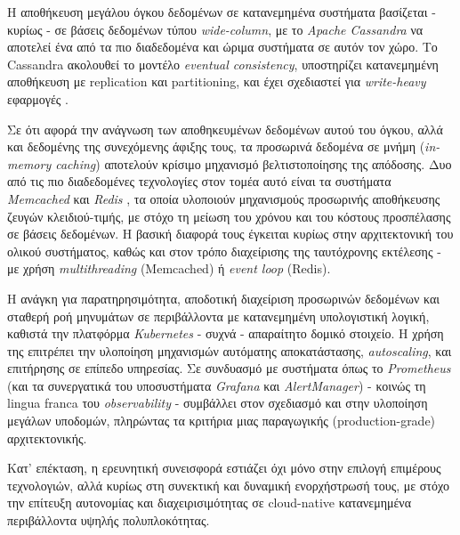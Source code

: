 Η αποθήκευση μεγάλου όγκου δεδομένων σε κατανεμημένα συστήματα βασίζεται - κυρίως - σε βάσεις δεδομένων τύπου \textit{wide-column}, με το \textit{Apache Cassandra} να αποτελεί ένα από τα πιο διαδεδομένα και ώριμα συστήματα σε αυτόν τον χώρο. Το Cassandra ακολουθεί το μοντέλο \textit{eventual consistency}, υποστηρίζει κατανεμημένη αποθήκευση με replication και partitioning, και έχει σχεδιαστεί για \textit{write-heavy} εφαρμογές \cite{cassandrawp}.

Σε ότι αφορά την ανάγνωση των αποθηκευμένων δεδομένων αυτού του όγκου, αλλά και δεδομένης της συνεχόμενης άφιξης τους, τα προσωρινά δεδομένα σε μνήμη (\textit{in-memory caching}) αποτελούν κρίσιμο μηχανισμό βελτιστοποίησης της απόδοσης. Δυο από τις πιο διαδεδομένες τεχνολογίες στον τομέα αυτό είναι τα συστήματα \textit{Memcached} \cite{memcachedfb} και \textit{Redis} \cite{redisia}, τα οποία υλοποιούν μηχανισμούς προσωρινής αποθήκευσης ζευγών κλειδιού-τιμής, με στόχο τη μείωση του χρόνου και του κόστους προσπέλασης σε βάσεις δεδομένων. Η βασική διαφορά τους έγκειται κυρίως στην αρχιτεκτονική του ολικού συστήματος, καθώς και στον τρόπο διαχείρισης της ταυτόχρονης εκτέλεσης - με χρήση \textit{multithreading} (Memcached) ή \textit{event loop} (Redis).

Η ανάγκη για παρατηρησιμότητα, αποδοτική διαχείριση προσωρινών δεδομένων και σταθερή ροή μηνυμάτων σε περιβάλλοντα με κατανεμημένη υπολογιστική λογική, καθιστά την πλατφόρμα \textit{Kubernetes} - συχνά -  απαραίτητο δομικό στοιχείο. Η χρήση της επιτρέπει την υλοποίηση μηχανισμών αυτόματης αποκατάστασης, \textit{autoscaling}, και επιτήρησης σε επίπεδο υπηρεσίας. Σε συνδυασμό με συστήματα όπως το \textit{Prometheus} (και τα συνεργατικά του υποσυστήματα \textit{Grafana} και \textit{AlertManager}) \cite{inframon} - κοινώς τη lingua franca του \textit{observability} - συμβάλλει στον σχεδιασμό και στην υλοποίηση μεγάλων υποδομών, πληρώντας τα κριτήρια μιας παραγωγικής (production-grade) αρχιτεκτονικής.

Κατ’ επέκταση, η ερευνητική συνεισφορά εστιάζει όχι μόνο στην επιλογή επιμέρους τεχνολογιών, αλλά κυρίως στη συνεκτική και δυναμική ενορχήστρωσή τους, με στόχο την επίτευξη αυτονομίας και διαχειρισιμότητας σε cloud-native κατανεμημένα περιβάλλοντα υψηλής πολυπλοκότητας.
